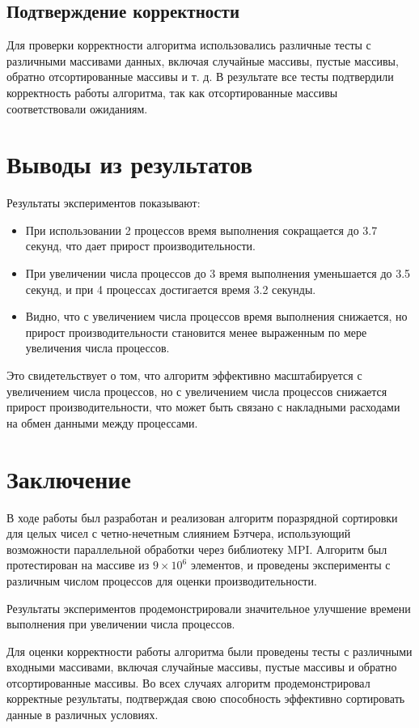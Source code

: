\documentclass[12pt]{article}
\begin{document}
\subsection{Подтверждение корректности}
Для проверки корректности алгоритма использовались различные тесты с различными массивами данных, включая случайные массивы, пустые массивы, обратно отсортированные массивы и т. д. В результате все тесты подтвердили корректность работы алгоритма, так как отсортированные массивы соответствовали ожиданиям.

\section{Выводы из результатов}
Результаты экспериментов показывают:
\begin{itemize}
    \item При использовании 2 процессов время выполнения сокращается до 3.7 секунд, что дает прирост производительности.
    \item При увеличении числа процессов до 3 время выполнения уменьшается до 3.5 секунд, и при 4 процессах достигается время 3.2 секунды.
    \item Видно, что с увеличением числа процессов время выполнения снижается, но прирост производительности становится менее выраженным по мере увеличения числа процессов.
\end{itemize}
Это свидетельствует о том, что алгоритм эффективно масштабируется с увеличением числа процессов, но с увеличением числа процессов снижается прирост производительности, что может быть связано с накладными расходами на обмен данными между процессами.

\section{Заключение}
В ходе работы был разработан и реализован алгоритм поразрядной сортировки для целых чисел с четно-нечетным слиянием Бэтчера, использующий возможности параллельной обработки через библиотеку MPI. Алгоритм был протестирован на массиве из $9 \times 10^6$ элементов, и проведены эксперименты с различным числом процессов для оценки производительности.

Результаты экспериментов продемонстрировали значительное улучшение времени выполнения при увеличении числа процессов.

Для оценки корректности работы алгоритма были проведены тесты с различными входными массивами, включая случайные массивы, пустые массивы и обратно отсортированные массивы. Во всех случаях алгоритм продемонстрировал корректные результаты, подтверждая свою способность эффективно сортировать данные в различных условиях.
\end{document}
